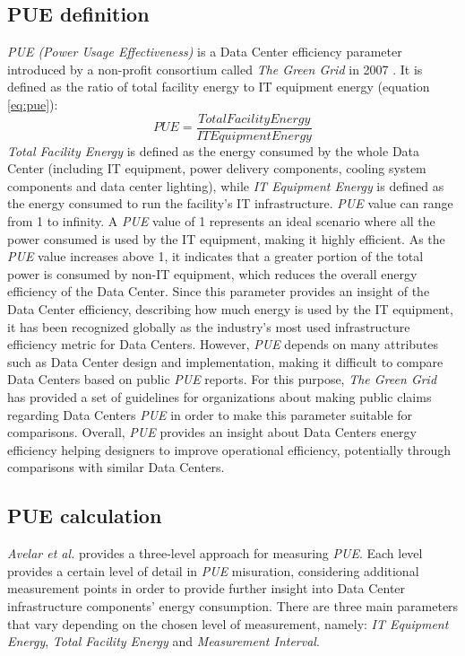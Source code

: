 \subsection{PUE definition}
\emph{PUE (Power Usage Effectiveness)} is a Data Center efficiency parameter introduced by a non-profit consortium called \emph{The Green Grid} in 2007 \cite{avelar2012pue}. It is defined as the ratio of total facility energy to IT equipment energy (equation \ref{eq:pue}):
\begin{displaymath} \label{eq:pue}
    PUE = \frac{Total Facility Energy}{IT Equipment Energy}
\end{displaymath}
\emph{Total Facility Energy} is defined as the energy consumed by the whole Data Center (including IT equipment, power delivery components, cooling system components and data center lighting), while \emph{IT Equipment Energy} is defined as the energy consumed to run the facility's IT infrastructure. \emph{PUE} value can range from 1 to infinity. A \emph{PUE} value of 1 represents an ideal scenario where all the power consumed is used by the IT equipment, making it highly efficient. As the \emph{PUE} value increases above 1, it indicates that a greater portion of the total power is consumed by non-IT equipment, which reduces the overall energy efficiency of the Data Center. Since this parameter provides an insight of the Data Center efficiency, describing how much energy is used by the IT equipment, it has been recognized globally as the industry's most used infrastructure efficiency metric for Data Centers. However, \emph{PUE} depends on many attributes such as Data Center design and implementation, making it difficult to compare Data Centers based on public \emph{PUE} reports. For this purpose, \emph{The Green Grid} has provided a set of guidelines for organizations about making public claims regarding Data Centers \emph{PUE} in order to make this parameter suitable for comparisons. Overall, \emph{PUE} provides an insight about Data Centers energy efficiency helping designers to improve operational efficiency, potentially through comparisons with similar Data Centers. 

\subsection{PUE calculation} \label{subsection:puecalculation}
\emph{Avelar et al.} \cite{avelar2012pue} provides a three-level approach for measuring \emph{PUE}. Each level provides a certain level of detail in \emph{PUE} misuration, considering additional measurement points in order to provide further insight into Data Center infrastructure components' energy consumption. There are three main parameters that vary depending on the chosen level of measurement, namely: \emph{IT Equipment Energy}, \emph{Total Facility Energy} and \emph{Measurement Interval}. 

